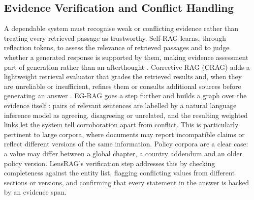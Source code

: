 \documentclass[11pt,letterpaper,oneside]{report}
\begin{document}
\subsection{Evidence Verification and Conflict Handling}
\label{sec:verification}
A dependable system must recognise weak or conflicting evidence rather than
treating every retrieved passage as trustworthy. Self-RAG learns, through
reflection tokens, to assess the relevance of retrieved passages and to judge
whether a generated response is supported by them, making evidence assessment
part of generation rather than an afterthought \citep{asai2024selfrag}.
Corrective RAG (CRAG) adds a lightweight retrieval evaluator that grades the
retrieved results and, when they are unreliable or insufficient, refines them
or consults additional sources before generating an answer
\citep{yan2024crag}. EG-RAG goes a step further and builds a graph over
the evidence itself \citep{hong2026egrag}: pairs of relevant sentences are
labelled by a natural language inference model as agreeing, disagreeing or
unrelated, and the resulting weighted links let the system tell
corroboration apart from conflict. This is particularly pertinent to large corpora, where
documents may report incompatible claims or reflect different versions of the
same information. Policy corpora are a clear case: a value may differ between
a global chapter, a country addendum and an older policy version. LensRAG's
verification step addresses this by checking completeness against the entity
list, flagging conflicting values from different sections or versions, and
confirming that every statement in the answer is backed by an evidence span.
\end{document}
